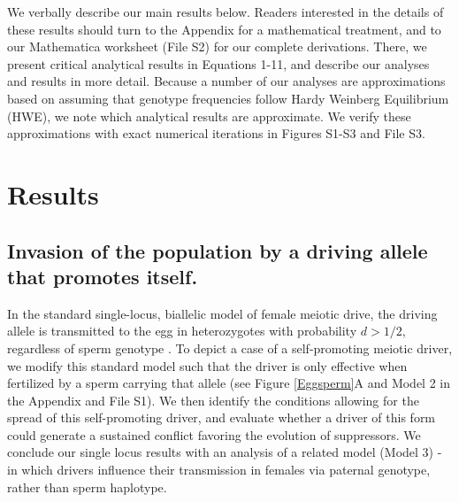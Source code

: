 \documentclass[12pt,letterpaper]{article}
\begin{document}
We verbally describe our main results below.  
Readers interested in the details of these results should turn to the Appendix for a mathematical treatment, 
	and to our Mathematica worksheet  (File S2) for our complete derivations. 
There, we present critical analytical results in Equations 1-11, and describe our analyses and results in more detail.  
Because a number of our analyses are approximations based on assuming
that genotype frequencies follow Hardy Weinberg Equilibrium (HWE), we note which analytical results are approximate. 
We verify these approximations with exact numerical iterations in Figures S1-S3 and File S3.


\section*{Results}

\subsection*{Invasion of the population by a driving allele that promotes itself.}

In the standard single-locus, biallelic model of female meiotic drive,
the driving allele is transmitted to the egg in heterozygotes with
probability  $d > 1/2$, regardless of sperm genotype \cite[e.g. ][ and see Model 1 in the Appendix for more details]{Ubeda2004}. 
 To depict a case of a self-promoting meiotic driver,  we modify this standard model such 
	that the driver is only effective when fertilized by a sperm
        carrying that allele (see Figure \ref{Eggsperm}A and Model 2
        in the Appendix and File S1). 
We then identify the conditions allowing for the spread of this self-promoting driver, 
	and evaluate whether a driver of this form could generate a sustained conflict favoring the evolution of suppressors. 
We conclude our single locus results with an analysis of a related model (Model 3) - in which
drivers influence their transmission in females via paternal genotype,
rather than sperm haplotype. \newline 
\end{document}

